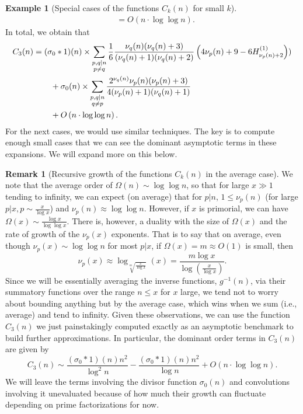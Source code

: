 \documentclass[11pt,reqno,a4letter]{article}
\numberwithin{figure}{section}
\numberwithin{table}{section}
\theoremstyle{plain}
\numberwithin{theorem}{section}
\theoremstyle{definition}
\newtheorem{example}[theorem]{Example}
\newtheorem{remark}[theorem]{Remark}
\begin{document}
\begin{example}[Special cases of the functions $C_k(n)$ for small $k$]
\begin{align*}
     & = O\left(n \cdot \log\log n\right). 
\end{align*} 
In total, we obtain that 
\begin{align} 
\label{eqn_ExactFormula_Ck3n} 
C_3(n) & = (\sigma_0 \ast 1)(n) \times \sum_{\substack{p,q|n \\ p \neq q}} 
     \frac{1}{6}\frac{\nu_q(n) (\nu_q(n) + 3)}{ 
     (\nu_q(n)+1)(\nu_q(n)+2)} \left(4\nu_p(n)+9-6 H_{\nu_p(n)+2}^{(1)}\right)) \\ 
\notag 
     & \phantom{= \quad\ } + 
     \sigma_0(n) \times \sum_{\substack{p,q|n \\ q \neq p}} 
     \frac{2^{\nu_q(n)} \nu_p(n) (\nu_p(n) + 3)}{4 (\nu_p(n) + 1) (\nu_q(n) + 1)} \\ 
\notag
     & \phantom{= \quad\ } + 
     O\left(n \cdot \log\log n\right). 
\end{align} 
For the next cases, we would use similar techniques. The key is to compute enough small cases that we can see 
the dominant asymptotic terms in these expansions. We will expand more on this below. 
\end{example}

\begin{remark}[Recursive growth of the functions $C_k(n)$ in the average case]
We note that the average order of $\Omega(n) \sim \log\log n$, so that for large $x \gg 1$ tending to 
infinity, we can expect (on average) that for $p|n$, $1 \leq \nu_p(n)$ (for large $p|x, p \sim \frac{x}{\log x}$) 
and $\nu_p(n) \approx \log\log n$. However, if $x$ is primorial, we can have 
$\Omega(x) \sim \frac{\log x}{\log\log x}$. There is, however, a duality with the size of $\Omega(x)$ and the 
rate of growth of the $\nu_p(x)$ exponents. That is to say that on average, 
even though $\nu_p(x) \sim \log\log n$ for most $p|x$, if $\Omega(x) = m \approx O(1)$ is small, then 
\[
\nu_p(x) \approx \log_{\sqrt[m]{\frac{x}{\log x}}}(x) = \frac{m \log x}{\log\left(\frac{x}{\log x}\right)}. 
\]
Since we will be essentially averaging the inverse functions, $g^{-1}(n)$, via their summatory functions 
over the range $n \leq x$ for $x$ large, we tend not to worry about bounding anything but by the 
average case, which wins when we sum (i.e., average) and tend to infinity. 
Given these observations, we can use the function $C_3(n)$ we just painstakingly computed exactly 
as an asymptotic benchmark to build further approximations. In particular, the dominant order terms in 
$C_3(n)$ are given by 
\[
C_3(n) \sim \frac{(\sigma_0 \ast 1)(n) n^2}{\log^2 n} - 
     \frac{(\sigma_0 \ast 1)(n) n^2}{\log n} + 
     O\left(n \cdot \log\log n\right). 
\]
We will leave the terms involving the divisor function $\sigma_0(n)$ and convolutions 
involving it unevaluated because of how much their growth can fluctuate depending on prime 
factorizations for now. 
\end{remark} 
\end{document}

